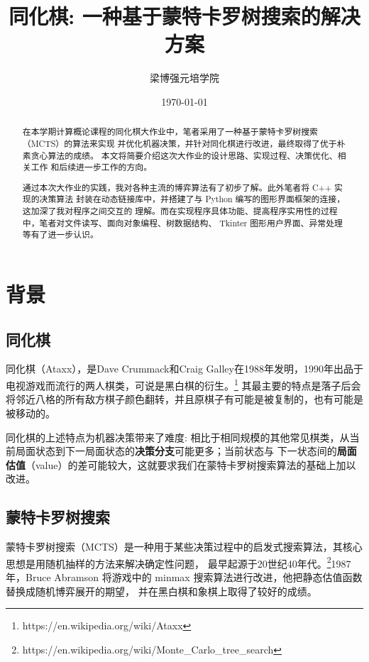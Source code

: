 \documentclass[12pt]{ctexart}
\begin{document}
	\title{同化棋: 一种基于蒙特卡罗树搜索的解决方案}
	\author{梁博强\quad 元培学院}
	\date{\today}
	\maketitle

	\begin{abstract}
		\normalsize
		在本学期计算概论课程的同化棋大作业中，笔者采用了一种基于蒙特卡罗树搜索（MCTS）的算法来实现
		并优化机器决策，并针对同化棋进行改进，最终取得了优于朴素贪心算法的成绩。
		本文将简要介绍这次大作业的设计思路、实现过程、决策优化、相关工作
		和后续进一步工作的方向。
	
		通过本次大作业的实践，我对各种主流的博弈算法有了初步了解。此外笔者将 C++ 实现的决策算法
		封装在动态链接库中，并搭建了与 Python 编写的图形界面框架的连接，这加深了我对程序之间交互的
		理解。而在实现程序具体功能、提高程序实用性的过程中，笔者对文件读写、面向对象编程、树数据结构、
		Tkinter 图形用户界面、异常处理等有了进一步认识。
	\end{abstract}

	\section{背景}

	\subsection{同化棋}
	同化棋（Ataxx），是Dave Crummack和Craig Galley在1988年发明，1990年出品于电视游戏而流行的两人棋类，可说是黑白棋的衍生。\footnote{https://en.wikipedia.org/wiki/Ataxx}
	其最主要的特点是落子后会将邻近八格的所有敌方棋子颜色翻转，并且原棋子有可能是被复制的，也有可能是被移动的。

	同化棋的上述特点为机器决策带来了难度: 相比于相同规模的其他常见棋类，从当前局面状态到下一局面状态的\textbf{决策分支}可能更多；当前状态与
	下一状态间的\textbf{局面估值}（value）的差可能较大，这就要求我们在蒙特卡罗树搜索算法的基础上加以改进。

	\subsection{蒙特卡罗树搜索}
	蒙特卡罗树搜索（MCTS）是一种用于某些决策过程中的启发式搜索算法，其核心思想是用随机抽样的方法来解决确定性问题，
	最早起源于20世纪40年代。\footnote{https://en.wikipedia.org/wiki/Monte\_Carlo\_tree\_search}1987年，Bruce Abramson 将游戏中的 minmax 搜索算法进行改进，他把静态估值函数替换成随机博弈展开的期望，
	并在黑白棋和象棋上取得了较好的成绩。
\end{document}
